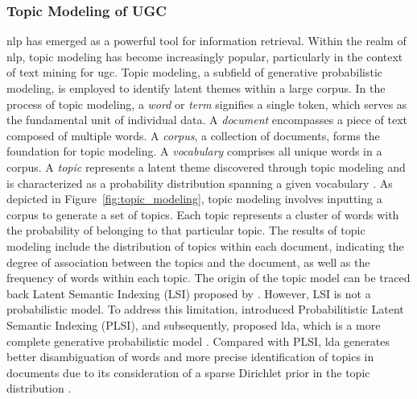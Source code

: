 \documentclass{article}
\theoremstyle{remark}
\begin{document}
\subsubsection{Topic Modeling of UGC}
\acrfull{nlp} has emerged as a powerful tool for information retrieval. Within the realm of \acrshort{nlp}, topic modeling has become increasingly popular, particularly in the context of text mining for \acrshort{ugc}. Topic modeling, a subfield of generative probabilistic modeling, is employed to identify latent themes within a large corpus. In the process of topic modeling, a \textit{word} or \textit{term} signifies a single token, which serves as the fundamental unit of individual data. A \textit{document} encompasses a piece of text composed of multiple words. A \textit{corpus}, a collection of documents, forms the foundation for topic modeling. A \textit{vocabulary} comprises all unique words in a corpus. A \textit{topic} represents a latent theme discovered through topic modeling and is characterized as a probability distribution spanning a given vocabulary \citep{vayansky_review_2020}. As depicted in Figure~\ref{fig:topic_modeling}, topic modeling involves inputting a corpus to generate a set of topics. Each topic represents a cluster of words with the probability of belonging to that particular topic. The results of topic modeling include the distribution of topics within each document, indicating the degree of association between the topics and the document, as well as the frequency of words within each topic. The origin of the topic model can be traced back Latent Semantic Indexing (LSI) proposed by \cite{papadimitriou_latent_2000}. However, LSI is not a probabilistic model. To address this limitation, \cite{hofmann_unsupervised_2001} introduced Probabilitistic Latent Semantic Indexing (PLSI), and subsequently, \cite{blei_latent_2003} proposed \acrfull{lda}, which is a more complete generative probabilistic model \citep{liu_overview_2016}. Compared with PLSI, \acrshort{lda} generates better disambiguation of words and more precise identification of topics in documents due to its consideration of a sparse Dirichlet prior in the topic distribution \citep{barde_overview_2017}.
\end{document}
